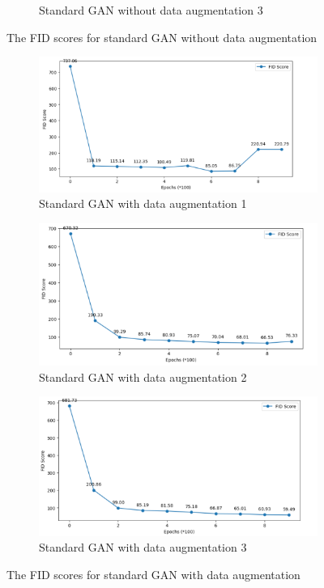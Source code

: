 \begin{figure}[H]
\begin{subfigure}[b]{\linewidth}
        \caption{Standard GAN without data augmentation 3}
        \label{fig:Conv2DTranspose}
    \end{subfigure}
    \caption{The FID scores for standard GAN without data augmentation}
    \label{fig:combined}
\end{figure}


\begin{figure}[H]
    \centering
    \begin{subfigure}[b]{\linewidth}
        \centering
        \includegraphics[width=0.84\linewidth]{./Images/standard_GAN_with_data_augementation1.jpg}
        \caption{Standard GAN with data augmentation 1}
        \label{fig:Dense}
    \end{subfigure}
    \vspace{0.05\linewidth} 
    \begin{subfigure}[b]{\linewidth}
        \centering
        \includegraphics[width=0.8\linewidth]{./Images/standard_GAN_with_data_augementation2.jpg}
        \caption{Standard GAN with data augmentation 2}
        \label{fig:Conv2DTranspose}
    \end{subfigure}
    \begin{subfigure}[b]{\linewidth}
        \centering
        \includegraphics[width=0.8\linewidth]{./Images/standard_GAN_with_data_augementation3.jpg}
        \caption{Standard GAN with data augmentation 3}
        \label{fig:Conv2DTranspose}
    \end{subfigure}
    \caption{The FID scores for standard GAN with data augmentation}
    \label{fig:combined}
\end{figure}
